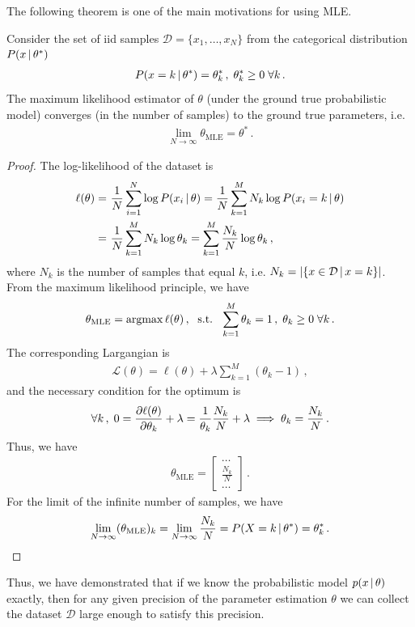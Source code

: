 The following theorem is one of the main motivations for using MLE.
\begin{theorem}
    Consider the set of iid samples $\mathcal{D} = \{x_1,\ldots, x_N\}$ from the categorical distribution $P(x\,|\, \theta^*)$
    \begin{align}
        P(x = k \,|\, \theta^*) = \theta^*_k\,,\; \theta^*_k \geq 0\;\forall k\,.
    \end{align}
    The maximum likelihood estimator of $\theta$ (under the ground true probabilistic model) converges (in the number of samples) to the ground true parameters, i.e.
    \begin{align}
        \lim_{N\to\infty} \theta_{\text{MLE}} = \theta^*\,.
    \end{align}
\end{theorem}
\begin{proof}
    The log-likelihood of the dataset is
    \begin{align}
        \ell(\theta) =~& \frac{1}{N}\sum_{i=1}^N\log P(x_i\,|\, \theta) = \frac{1}{N}\sum_{k=1}^MN_k\log P(x_i=k\,|\, \theta)\\
        =~& \frac{1}{N}\sum_{k=1}^MN_k\log \theta_k = \sum_{k=1}^M\frac{N_k}{N}\log \theta_k\,,
    \end{align}
    where $N_k$ is the number of samples that equal $k$, i.e. $N_k = |\{x \in \mathcal{D}  \,|\, x = k\}|$.
    From the maximum likelihood principle, we have
    \begin{align}
        \theta_{\text{MLE}} = \operatorname*{argmax} \ell(\theta)\,, \;\text{ s.t. }\; \sum_{k=1}^M\theta_k = 1\,,\; \theta_k \geq 0\;\forall k\,.
    \end{align}
    The corresponding Largangian is
    \begin{align}
        \mathcal{L}(\theta) = \ell(\theta) + \lambda \sum_{k=1}^M(\theta_k - 1)\,,
    \end{align}
    and the necessary condition for the optimum is
    \begin{align}
        \forall k\,,\;0 = \frac{\partial \ell(\theta)}{\partial \theta_k}  + \lambda = \frac{1}{\theta_k}\frac{N_k}{N}  + \lambda \implies \theta_k = \frac{N_k}{N}\,.
    \end{align}
    Thus, we have
    \begin{align}
        \theta_{\text{MLE}} = \begin{bmatrix}
            \ldots\\
            \frac{N_k}{N}\\
            \ldots
        \end{bmatrix}\,.
    \end{align}
    For the limit of the infinite number of samples, we have
    \begin{align}
        \lim_{N\to\infty} (\theta_{\text{MLE}})_k = \lim_{N\to\infty}\frac{N_k}{N} = P(X=k\,|\, \theta^*) = \theta^*_k\,.
    \end{align}
\end{proof}
Thus, we have demonstrated that if we know the probabilistic model $p(x\,|\,\theta)$ exactly, then for any given precision of the parameter estimation $\theta$ we can collect the dataset $\mathcal{D}$ large enough to satisfy this precision.

